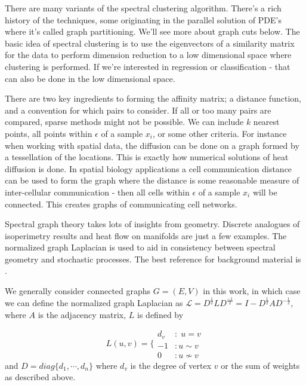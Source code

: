 There are many variants of the spectral clustering algorithm. There's a rich history of the techniques, some originating in the parallel solution of PDE's where it's called graph partitioning.  We'll see more about graph cuts below. The basic idea of spectral clustering is to use the eigenvectors of a similarity matrix for the data to perform dimension reduction to a low dimensional space where clustering is performed.  If we're interested in regression or classification - that can also be done in the low dimensional space. 

There are two key ingredients to forming the affinity matrix; a distance function, and a convention for which pairs to consider.  If all or too many pairs are compared, sparse methods might not be possible.  We can include $k$ nearest points, all points within $\epsilon$ of a sample $x_i$, or some other criteria. For instance when working with spatial data, the diffusion can be done on a graph formed by a tessellation of the locations.  This is exactly how numerical solutions of heat diffusion is done. In spatial biology applications a cell communication distance can be used to form the graph where the distance is some reasonable measure of inter-cellular communication - then all cells within $\epsilon$ of a sample $x_i$ will be connected. This creates graphs of communicating cell networks. 

Spectral graph theory takes lots of insights from geometry.  Discrete analogues of isoperimetry results and heat flow on manifolds are just a few examples.  The normalized graph Laplacian is used to aid in consistency between spectral geometry and stochastic processes.  The best reference for background material is \cite{chung1997spectral}. 

We generally consider connected graphs $G = (E,V)$ in this work, in which case we can define the normalized graph Laplacian as $\mathcal{L} = D^{\frac{1}{2}} L D^{\frac{-1}{2}} = I - D^{\frac{1}{2}} A D^{-\frac{1}{2}}$, where $A$ is the adjacency matrix, $L$ is defined by

\begin{equation*}
L(u,v)  = \Biggl\{
\begin{array}{cc}
 d_v & :\; u=v \\
 -1  & : u\sim v  \\
 0   & : u \nsim v  \end{array}
\end{equation*} and
$D = diag\{d_1, \cdots , d_n\}$ where $d_v$ is the degree of vertex $v$ or the sum of weights as described above.

